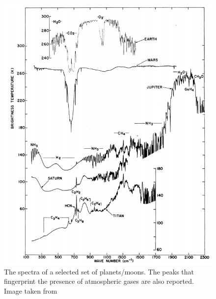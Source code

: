 \documentclass[
12pt, %
a4paper, %
oneside, %
headinclude,footinclude, %
BCOR5mm, %
]{scrartcl}
\begin{document}
\begin{figure}[h]
\begin{center}
\includegraphics[width=1\textwidth]{Pic/Absorption_gas.png}
\caption{The spectra of a selected set of planets/moons. The peaks that fingerprint the presence of atmospheric gases are also reported. Image taken from \cite{catling2017atmospheric}}
\label{BlackBody_greenhouse}
\end{center}
\end{figure}
\end{document}
